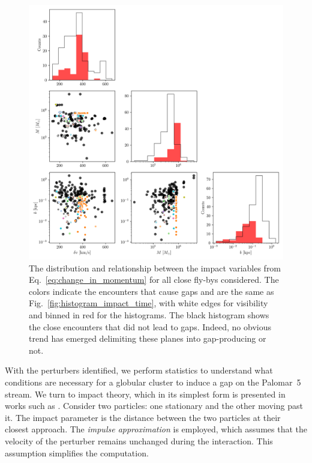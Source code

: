 \documentclass{aa}
\begin{document}
    \begin{figure}
      \centering
      \includegraphics[width=\linewidth]{impact_geometry_statistics.png}
      \caption{The distribution and relationship between the impact variables from Eq.~\ref{eq:change_in_momentum} for all close fly-bys considered. The colors indicate the encounters that cause gaps and are the same as Fig.~\ref{fig:histogram_impact_time}, with white edges for visibility and binned in red for the histograms. The black histogram shows the close encounters that did not lead to gaps. Indeed, no obvious trend has emerged delimiting these planes into gap-producing or not.}
      \label{fig:impact_geometry_statistics}    
    \end{figure}



    With the perturbers identified, we perform statistics to understand what conditions are necessary for a globular cluster to induce a gap on the Palomar~5 stream. We turn to impact theory, which in its simplest form is presented in works such as \citet{2008gady.book.....B}. Consider two particles: one stationary and the other moving past it. The impact parameter is the distance between the two particles at their closest approach. The \textit{impulse approximation} is employed, which assumes that the velocity of the perturber remains unchanged during the interaction. This assumption simplifies the computation.
\end{document}

